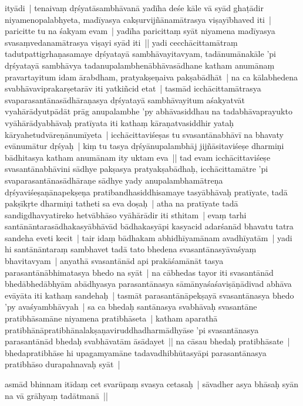 \documentclass[article,12pt,a4paper]{memoir}%
\newcounter{parCount}
\begin{document}
	  \pstart \leavevmode%
	ityādi | tenaivaṃ dṛśyatāsambhāvanā yadīha deśe kāle vā syād ghaṭādir niyamenopalabhyeta, madīyasya cakṣurvijñānamātrasya viṣayībhaved iti | paricitte tu na śakyam evam | yadīha paricittaṃ syāt niyamena madīyasya svasaṃvedanamātrasya viṣayi syād iti || \label{thakur75-146.26} yadi cecchācittamātraṃ tadutpattigrhaṇasamaye dṛśyatayā sambhāvayitavyam, tadānumānakāle 'pi dṛśyatayā sambhāvya tadanupalambhenābhāvasādhane katham anumānaṃ pravartayitum idam ārabdham, pratyakṣeṇaiva pakṣabādhāt | na ca kālabhedena svabhāvaviprakarṣetarāv iti yatkiñcid etat | tasmād icchācittamātrasya svaparasantānasādhāraṇasya dṛśyatayā sambhāvayitum aśakyatvāt vyahārādyutpādāt prāg anupalambhe 'py abhāvasiddhau na tadabhāvaprayukto vyāhārādyabhāvaḥ pratīyata iti kathaṃ kāraṇatvasiddhir yataḥ kāryahetudvāreṇānumīyeta | icchācittaviśeṣas tu svasantānabhāvī na bhavaty evānumātur dṛśyaḥ | kiṃ tu tasya dṛśyānupalambhāj jijñāsitaviśeṣe dharmiṇi bādhitasya katham anumānam ity uktam eva || \label{thakur75-147.1} tad evam icchācittaviśeṣe svasantānabhāvini sādhye pakṣasya pratyakṣabādhaḥ, icchācittamātre 'pi svaparasantānasādhāraṇe sādhye yady anupalambhamātreṇa dṛśyaviśeṣaṇānapekṣeṇa pratibandhasiddhisamaye tasyābhāvaḥ pratīyate, tadā pakṣīkṛte dharmiṇi tatheti sa eva doṣaḥ | atha na pratīyate tadā sandigdhavyatireko hetvābhāso vyāhārādir iti sthitam | \label{thakur75-147.6} evaṃ tarhi santānāntarasādhakasyābhāvād bādhakasyāpi kasyacid adarśanād bhavatu tatra sandeha eveti kecit | tair idaṃ bādhakam abhidhīyamānam avadhīyatām | yadi hi santānāntaraṃ sambhavet tadā tato bhedena svasantānasyāvaśyaṃ bhavitavyam | anyathā svasantānād api prakāśamānāt tasya parasantānābhimatasya bhedo na syāt | na cābhedas tayor iti svasantānād bhedābhedābhyām abādhyasya parasantānasya sāmānyaśaśaviṣāṇādivad abhāva evāyāta iti kathaṃ sandehaḥ | tasmāt parasantānāpekṣayā svasantānasya bhedo 'py avaśyambhāvyah | sa ca bhedaḥ santānasya svabhāvaḥ svasantāne pratibhāsamāne niyamena pratibhāseta | katham aparathā pratibhānāpratibhānalakṣaṇaviruddhadharmādhyāse 'pi svasantānasya parasantānād bhedaḥ svabhāvatām āsādayet || \label{thakur75-147.15} na cāsau bhedaḥ pratibhāsate | bhedapratibhāse hi upagamyamāne tadavadhibhūtasyāpi parasantānasya pratibhāso durapahnavaḥ syāt |
	{}
	\pend%
      

	  \pstart \leavevmode%
	asmād bhinnam itīdaṃ cet svarūpaṃ svasya cetasaḥ | sāvadher asya bhāsaḥ syān na vā grāhyaṃ tadātmanā || 
	{}
	\pend%
      
\end{document}
